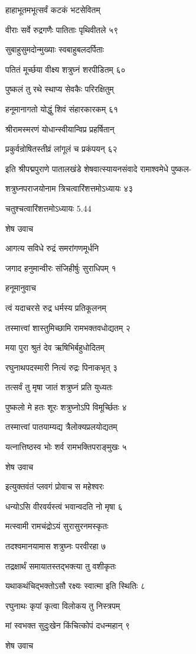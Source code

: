 हाहाभूतमभूत्सर्वं कटकं भटसेवितम्

वीराः सर्वे रुद्रगणैः पातिताः पृथिवीतले ५९

सुबाहुसुमदोन्मुख्याः स्वबाहुबलदर्पिताः

पतितं मूर्च्छया वीक्ष्य शत्रुघ्नं शरपीडितम् ६०

पुष्कलं तु रथे स्थाप्य सेवकैः परिरक्षितुम्

हनूमानागतो योद्धुं शिवं संहारकारकम् ६१

श्रीरामस्मरणं योधान्स्वीयान्विप्र प्रहर्षितान्

प्रकुर्वन्रोषितस्तीव्रं लांगूलं च प्रकंपयन् ६२

इति श्रीपद्मपुराणे पातालखंडे शेषवात्स्यायनसंवादे रामाश्वमेधे पुष्कल-

शत्रुघ्नपराजयोनाम त्रिचत्वारिंशत्तमोऽध्यायः ४३

चतुश्चत्वारिंशत्तमोऽध्यायः 5.44

शेष उवाच

आगत्य सविधे रुद्रं समरांगणमूर्धनि

जगाद हनुमान्वीरः संजिहीर्षुः सुराधिपम् १

हनूमानुवाच

त्वं यदाचरसे रुद्र धर्मस्य प्रतिकूलनम्

तस्मात्त्वां शास्तुमिच्छामि रामभक्तवधोद्यतम् २

मया पुरा श्रुतं देव ऋषिभिर्बहुधोदितम्

रघुनाथपदस्मारी नित्यं रुद्रः पिनाकभृत् ३

तत्सर्वं तु मृषा जातं शत्रुघ्नं प्रति युध्यतः

पुष्कलो मे हतः शूरः शत्रुघ्नोऽपि विमूर्च्छितः ४

तस्मात्त्वां पातयाम्यद्य त्रैलोक्यप्रलयोद्यतम्

यत्नात्तिष्ठस्व भोः शर्व रामभक्तिपराङ्मुखः ५

शेष उवाच

इत्युक्तवंतं प्लवगं प्रोवाच स महेश्वरः

धन्योऽसि वीरवर्यस्त्वं भवान्वदति नो मृषा ६

मत्स्वामी रामचंद्रोऽयं सुरासुरनमस्कृतः

तदश्वमानयामास शत्रुघ्नः परवीरहा ७

तद्रक्षार्थं समायातस्तद्भक्त्या तु वशीकृतः

यथाकथंचिद्भक्तोऽसौ रक्ष्यः स्वात्मा इति स्थितिः ८

रघुनाथः कृपां कृत्वा विलोकय तु निस्त्रपम्

मां स्वभक्त सुदुःखेन किंचित्कोपं दधन्महान् ९

शेष उवाच

